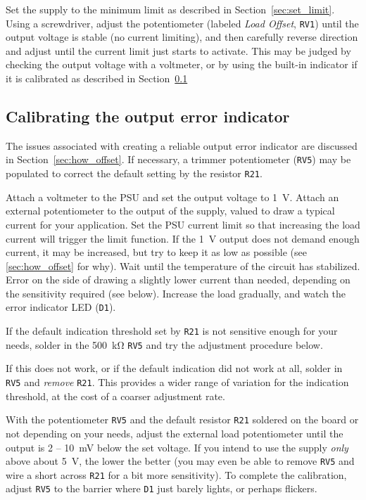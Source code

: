 \documentclass[letterpaper,twocolumn,10pt]{article}
\newcommand{\refdes}[1]{\texttt{#1}}
\begin{document}
Set the supply to the minimum limit as described in Section~\ref{sec:set_limit}.
Using a screwdriver, adjust the potentiometer (labeled \emph{Load
Offset}, \refdes{RV1}) until the output voltage is stable (no current limiting),
and then carefully reverse direction and adjust until the current limit just
starts to activate. This may be judged by checking the output voltage with a
voltmeter, or by using the built-in indicator if it is calibrated as described
in Section~\ref{sec:cal_offset}

\subsection{Calibrating the output error indicator}\label{sec:cal_offset}

The issues associated with creating a reliable output error indicator are
discussed in Section~\ref{sec:how_offset}. If necessary, a trimmer potentiometer
(\refdes{RV5}) may be populated to correct the default setting by the resistor
\refdes{R21}.

Attach a voltmeter to the PSU and set the output voltage to \SI{1}{\V}. Attach
an external potentiometer to the output of the supply, valued to draw a typical
current for your application. Set the PSU current limit so that increasing the
load current will trigger the limit function. If the \SI{1}{\V} output does not
demand enough current, it may be increased, but try to keep it as low as
possible (see \ref{sec:how_offset} for why). Wait until the temperature of the
circuit has stabilized. Error on the side of drawing a slightly lower current
than needed, depending on the sensitivity required (see below). Increase the
load gradually, and watch the error indicator LED (\refdes{D1}).

If the default indication threshold set by \refdes{R21} is not sensitive enough
for your needs, solder in the \SI{500}{\kohm} \refdes{RV5} and try the
adjustment procedure below.

If this does not work, or if the default indication did not work at all, solder
in \refdes{RV5} and \emph{remove} \refdes{R21}. This provides a wider range of
variation for the indication threshold, at the cost of a coarser adjustment
rate.

With the potentiometer \refdes{RV5} and the default resistor \refdes{R21}
soldered on the board or not depending on your needs, adjust the external load
potentiometer until the output is 2 -- \SI{10}{\mV} below the set voltage. If
you intend to use the supply \emph{only} above about \SI{5}{\V}, the lower the
better (you may even be able to remove \refdes{RV5} and wire a short across
\refdes{R21} for a bit more sensitivity). To complete the calibration, adjust
\refdes{RV5} to the barrier where \refdes{D1} just barely lights, or perhaps
flickers.
\end{document}
